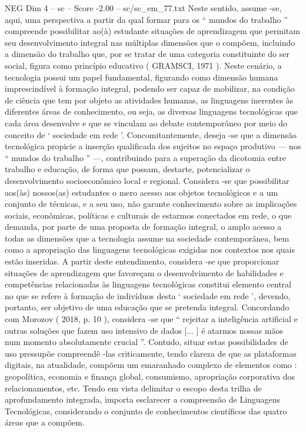 \begin{textsample}{NEG Dim 4 – sc – Score -2.00 – sc/sc\_em\_77.txt}
Neste sentido, assume -se, aqui, uma perspectiva a partir da qual formar para os “ mundos do trabalho ” compreende possibilitar ao(à) estudante situações de aprendizagem que permitam seu desenvolvimento integral nas múltiplas dimensões que o compõem, incluindo a dimensão do trabalho que, por se tratar de uma categoria constituinte do ser social, figura como princípio educativo ( GRAMSCI, 1971 ).
Neste cenário, a tecnologia possui um papel fundamental, figurando como dimensão humana imprescindível à formação integral, podendo ser capaz de mobilizar, na condição de ciência que tem por objeto as atividades humanas, as linguagens inerentes às diferentes áreas de conhecimento, ou seja, as diversas linguagens tecnológicas que cada área desenvolve e que se vinculam ao debate contemporâneo por meio do conceito de ‘ sociedade em rede ’.
Concomitantemente, deseja -se que a dimensão tecnológica propicie a inserção qualificada dos sujeitos no espaço produtivo — nos “ mundos do trabalho ” —, contribuindo para a superação da dicotomia entre trabalho e educação, de forma que possam, destarte, potencializar o desenvolvimento socioeconômico local e regional.
Considera -se que possibilitar aos(às) nossos(as) estudantes o mero acesso aos objetos tecnológicos e a um conjunto de técnicas, e a seu uso, não garante conhecimento sobre as implicações sociais, econômicas, políticas e culturais de estarmos conectados em rede, o que demanda, por parte de uma proposta de formação integral, o amplo acesso a todas as dimensões que a tecnologia assume na sociedade contemporânea, bem como a apropriação das linguagens tecnológicas exigidas nos contextos nos quais estão inseridas.
A partir deste entendimento, considera -se que proporcionar situações de aprendizagem que favoreçam o desenvolvimento de habilidades e competências relacionadas às linguagens tecnológicas constitui elemento central no que se refere à formação de indivíduos desta ‘ sociedade em rede ’, devendo, portanto, ser objetivo de uma educação que se pretenda integral.
Concordando com Morozov ( 2018, p. 10 ), considera -se que “ rejeitar a inteligência artificial e outras soluções que fazem uso intensivo de dados [... ] é atarmos nossas mãos num momento absolutamente crucial ”.
Contudo, situar estas possibilidades de uso pressupõe compreendê -las criticamente, tendo clareza de que as plataformas digitais, na atualidade, compõem um emaranhado complexo de elementos como : geopolítica, economia e finança global, consumismo, apropriação corporativa dos relacionamentos, etc.
Tendo em vista delimitar o escopo desta trilha de aprofundamento integrada, importa esclarecer a compreensão de Linguagens Tecnológicas, considerando o conjunto de conhecimentos científicos das quatro áreas que a compõem.

\end{textsample}
